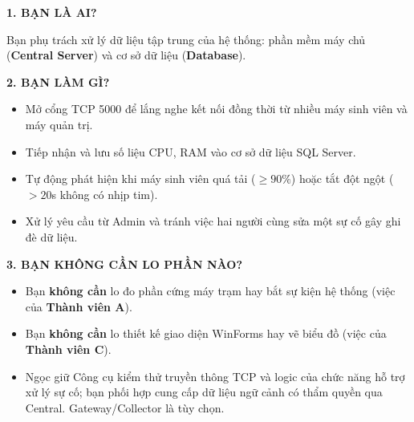 \documentclass[12pt,a4paper]{article}
\begin{document}
\begin{tcolorbox}[enhanced, colback=lgLightTeal, colframe=lgTeal, boxrule=0.8pt, arc=1.5mm, top=1.8mm, bottom=1.8mm, left=2.5mm, right=2.5mm]
{\bfseries\color{lgTeal} 1. BẠN LÀ AI?}\par
\vspace{0.5mm}
Bạn phụ trách xử lý dữ liệu tập trung của hệ thống: phần mềm máy chủ (\textbf{Central Server}) và cơ sở dữ liệu (\textbf{Database}).
\end{tcolorbox}
\vspace{1.5mm}

\begin{tcolorbox}[enhanced, colback=lgLightBlue, colframe=lgDeepBlue, boxrule=0.8pt, arc=1.5mm, top=1.8mm, bottom=1.8mm, left=2.5mm, right=2.5mm]
{\bfseries\color{lgDeepBlue} 2. BẠN LÀM GÌ?}\par
\vspace{0.5mm}
\begin{itemize}[leftmargin=1.5em, itemsep=0.5pt, parsep=0pt, topsep=1pt]
  \item Mở cổng TCP 5000 để lắng nghe kết nối đồng thời từ nhiều máy sinh viên và máy quản trị.
  \item Tiếp nhận và lưu số liệu CPU, RAM vào cơ sở dữ liệu SQL Server.
  \item Tự động phát hiện khi máy sinh viên quá tải ($\ge 90\%$) hoặc tắt đột ngột ($>20$s không có nhịp tim).
  \item Xử lý yêu cầu từ Admin và tránh việc hai người cùng sửa một sự cố gây ghi đè dữ liệu.
\end{itemize}
\end{tcolorbox}
\vspace{1.5mm}

\begin{tcolorbox}[enhanced, colback=lgLightRed, colframe=lgCrimson, boxrule=0.8pt, arc=1.5mm, top=1.8mm, bottom=1.8mm, left=2.5mm, right=2.5mm]
{\bfseries\color{lgCrimson} 3. BẠN KHÔNG CẦN LO PHẦN NÀO?}\par
\vspace{0.5mm}
\begin{itemize}[leftmargin=1.5em, itemsep=0.5pt, parsep=0pt, topsep=1pt]
  \item Bạn \textbf{không cần} lo đo phần cứng máy trạm hay bắt sự kiện hệ thống (việc của \textbf{Thành viên A}).
  \item Bạn \textbf{không cần} lo thiết kế giao diện WinForms hay vẽ biểu đồ (việc của \textbf{Thành viên C}).
  \item Ngọc giữ Công cụ kiểm thử truyền thông TCP và logic của chức năng hỗ trợ xử lý sự cố; bạn phối hợp cung cấp dữ liệu ngữ cảnh có thẩm quyền qua Central. Gateway/Collector là tùy chọn.
\end{itemize}
\end{tcolorbox}
\vspace{1.5mm}
\end{document}

